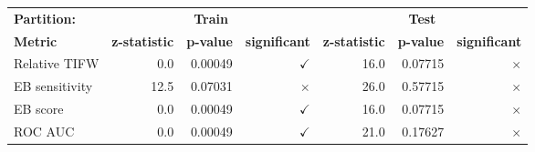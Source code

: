 \begin{tabular}{l r r r r r r}
    \toprule
    \textbf{Partition:} & \multicolumn{3}{c}{\textbf{Train}} & \multicolumn{3}{c}{\textbf{Test}} \\
    \cmidrule(lr){2-4}\cmidrule(lr){5-7}
    \textbf{Metric} & \textbf{z-statistic} & \textbf{p-value} & \textbf{significant}
    & \textbf{z-statistic} & \textbf{p-value} & \textbf{significant} \\
    \midrule
    Relative TIFW  & 0.0  & 0.00049 & $\checkmark$ & 16.0 & 0.07715 & $\times$ \\
    EB sensitivity & 12.5 & 0.07031 & $\times$     & 26.0 & 0.57715 & $\times$ \\
    EB score       & 0.0  & 0.00049 & $\checkmark$ & 16.0 & 0.07715 & $\times$ \\
    ROC AUC        & 0.0  & 0.00049 & $\checkmark$ & 21.0 & 0.17627 & $\times$ \\
    \bottomrule
\end{tabular}